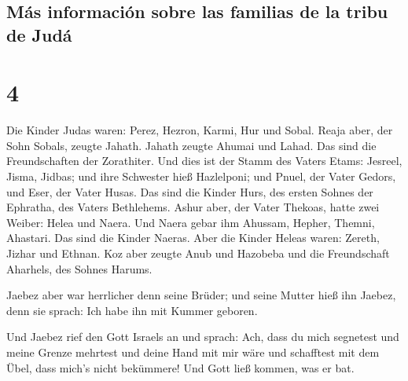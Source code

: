 \hypertarget{muxe1s-informaciuxf3n-sobre-las-familias-de-la-tribu-de-juduxe1}{%
\subsection{Más información sobre las familias de la tribu de
Judá}\label{muxe1s-informaciuxf3n-sobre-las-familias-de-la-tribu-de-juduxe1}}

\hypertarget{section-3}{%
\section{4}\label{section-3}}

 Die Kinder Judas waren: Perez, Hezron, Karmi, Hur und
Sobal.  Reaja aber, der Sohn Sobals, zeugte Jahath. Jahath
zeugte Ahumai und Lahad. Das sind die Freundschaften der Zorathiter.
 Und dies ist der Stamm des Vaters Etams: Jesreel, Jisma,
Jidbas; und ihre Schwester hieß Hazlelponi;  und Pnuel,
der Vater Gedors, und Eser, der Vater Husas. Das sind die Kinder Hurs,
des ersten Sohnes der Ephratha, des Vaters Bethlehems. 
Ashur aber, der Vater Thekoas, hatte zwei Weiber: Helea und Naera.
 Und Naera gebar ihm Ahussam, Hepher, Themni, Ahastari.
Das sind die Kinder Naeras.  Aber die Kinder Heleas waren:
Zereth, Jizhar und Ethnan.  Koz aber zeugte Anub und
Hazobeba und die Freundschaft Aharhels, des Sohnes Harums.

 Jaebez aber war herrlicher denn seine Brüder; und seine
Mutter hieß ihn Jaebez, denn sie sprach: Ich habe ihn mit Kummer
geboren.

 Und Jaebez rief den Gott Israels an und sprach: Ach,
dass du mich segnetest und meine Grenze mehrtest und deine Hand mit mir
wäre und schafftest mit dem Übel, dass mich's nicht bekümmere! Und Gott
ließ kommen, was er bat.

